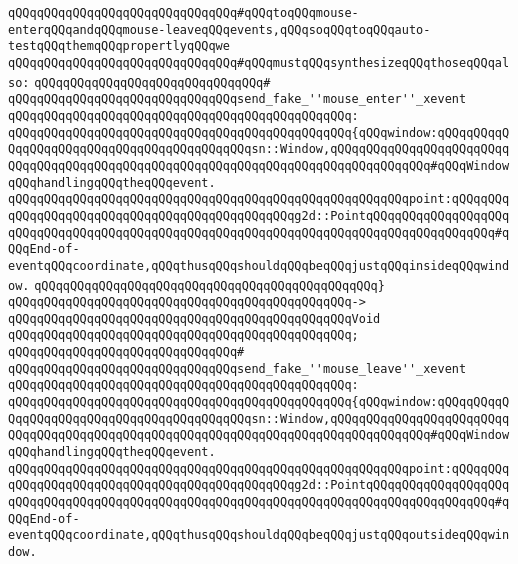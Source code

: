 \verb|qQQqqQQqqQQqqQQqqQQqqQQqqQQqqQQq#qQQqtoqQQqmouse-enterqQQqandqQQqmouse-leaveqQQqevents,qQQqsoqQQqtoqQQqauto-testqQQqthemqQQqpropertlyqQQqwe|\newline
\verb|qQQqqQQqqQQqqQQqqQQqqQQqqQQqqQQq#qQQqmustqQQqsynthesizeqQQqthoseqQQqalso:|\newline
\verb|qQQqqQQqqQQqqQQqqQQqqQQqqQQqqQQq#|\newline
\verb|qQQqqQQqqQQqqQQqqQQqqQQqqQQqqQQqsend_fake_''mouse_enter''_xevent|\newline
\verb|qQQqqQQqqQQqqQQqqQQqqQQqqQQqqQQqqQQqqQQqqQQqqQQq:|\newline
\verb|qQQqqQQqqQQqqQQqqQQqqQQqqQQqqQQqqQQqqQQqqQQqqQQq{qQQqwindow:qQQqqQQqqQQqqQQqqQQqqQQqqQQqqQQqqQQqqQQqqQQqsn::Window,qQQqqQQqqQQqqQQqqQQqqQQqqQQqqQQqqQQqqQQqqQQqqQQqqQQqqQQqqQQqqQQqqQQqqQQqqQQqqQQqqQQq#qQQqWindowqQQqhandlingqQQqtheqQQqevent.|\newline
\verb|qQQqqQQqqQQqqQQqqQQqqQQqqQQqqQQqqQQqqQQqqQQqqQQqqQQqqQQqpoint:qQQqqQQqqQQqqQQqqQQqqQQqqQQqqQQqqQQqqQQqqQQqqQQqg2d::PointqQQqqQQqqQQqqQQqqQQqqQQqqQQqqQQqqQQqqQQqqQQqqQQqqQQqqQQqqQQqqQQqqQQqqQQqqQQqqQQqqQQqqQQq#qQQqEnd-of-eventqQQqcoordinate,qQQqthusqQQqshouldqQQqbeqQQqjustqQQqinsideqQQqwindow.|\newline
\verb|qQQqqQQqqQQqqQQqqQQqqQQqqQQqqQQqqQQqqQQqqQQqqQQq}|\newline
\verb|qQQqqQQqqQQqqQQqqQQqqQQqqQQqqQQqqQQqqQQqqQQqqQQq->|\newline
\verb|qQQqqQQqqQQqqQQqqQQqqQQqqQQqqQQqqQQqqQQqqQQqqQQqVoid|\newline
\verb|qQQqqQQqqQQqqQQqqQQqqQQqqQQqqQQqqQQqqQQqqQQqqQQq;|\newline
\verb|qQQqqQQqqQQqqQQqqQQqqQQqqQQqqQQq#|\newline
\verb|qQQqqQQqqQQqqQQqqQQqqQQqqQQqqQQqsend_fake_''mouse_leave''_xevent|\newline
\verb|qQQqqQQqqQQqqQQqqQQqqQQqqQQqqQQqqQQqqQQqqQQqqQQq:|\newline
\verb|qQQqqQQqqQQqqQQqqQQqqQQqqQQqqQQqqQQqqQQqqQQqqQQq{qQQqwindow:qQQqqQQqqQQqqQQqqQQqqQQqqQQqqQQqqQQqqQQqqQQqsn::Window,qQQqqQQqqQQqqQQqqQQqqQQqqQQqqQQqqQQqqQQqqQQqqQQqqQQqqQQqqQQqqQQqqQQqqQQqqQQqqQQqqQQq#qQQqWindowqQQqhandlingqQQqtheqQQqevent.|\newline
\verb|qQQqqQQqqQQqqQQqqQQqqQQqqQQqqQQqqQQqqQQqqQQqqQQqqQQqqQQqpoint:qQQqqQQqqQQqqQQqqQQqqQQqqQQqqQQqqQQqqQQqqQQqqQQqg2d::PointqQQqqQQqqQQqqQQqqQQqqQQqqQQqqQQqqQQqqQQqqQQqqQQqqQQqqQQqqQQqqQQqqQQqqQQqqQQqqQQqqQQqqQQq#qQQqEnd-of-eventqQQqcoordinate,qQQqthusqQQqshouldqQQqbeqQQqjustqQQqoutsideqQQqwindow.|\newline

